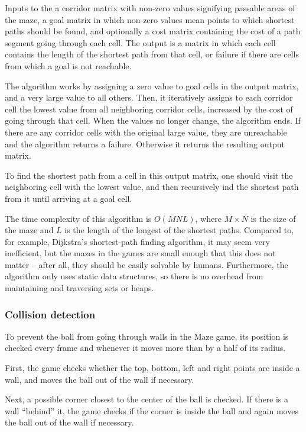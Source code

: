 \documentclass[a4paper,11pt]{article}
\begin{document}
Inputs to the a corridor matrix with non-zero values signifying passable areas
of the maze, a goal matrix in which non-zero values mean points to which
shortest paths should be found, and optionally a cost matrix containing
the cost of a path segment going through each cell.
The output is a matrix in which each cell contains the length of the shortest
path from that cell, or failure if there are cells from which a goal is not
reachable.

The algorithm works by assigning a zero value to goal cells in the output
matrix, and a very large value to all others.
Then, it iteratively assigns to each corridor cell the lowest value from all
neighboring corridor cells, increased by the cost of going through that cell.
When the values no longer change, the algorithm ends.
If there are any corridor cells with the original large value, they are
unreachable and the algorithm returns a failure.
Otherwise it returns the resulting output matrix.

To find the shortest path from a cell in this output matrix, one should visit
the neighboring cell with the lowest value, and then recursively ind the
shortest path from it until arriving at a goal cell.

The time complexity of this algorithm is $O(MNL)$, where $M \times N$ is the
size of the maze and $L$ is the length of the longest of the shortest paths.
Compared to, for example, Dijkstra's shortest-path finding algorithm, it may
seem very inefficient, but the mazes in the games are small enough that this
does not matter – after all, they should be easily solvable by humans.
Furthermore, the algorithm only uses static data structures, so there is
no overhead from maintaining and traversing sets or heaps.

\subsubsection{Collision detection}

To prevent the ball from going through walls in the Maze game, its position
is checked every frame and whenever it moves more than by a half of its radius.

First, the game checks whether the top, bottom, left and right points are
inside a wall, and moves the ball out of the wall if necessary.

Next, a possible corner closest to the center of the ball is checked.
If there is a wall “behind” it, the game checks if the corner is inside the ball
and again moves the ball out of the wall if necessary.
\end{document}
